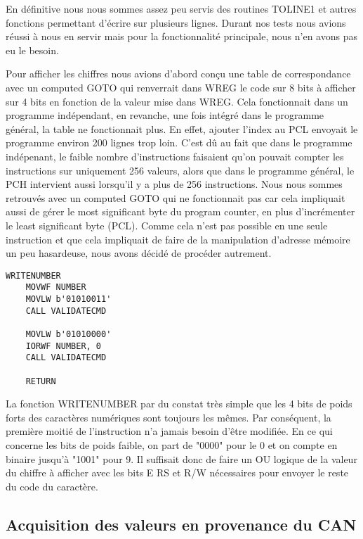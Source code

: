 \documentclass[a4paper,11pt,titlepage]{article}
\begin{document}
En définitive nous nous sommes assez peu servis des routines TOLINE1 et autres fonctions permettant d'écrire sur plusieurs lignes. Durant nos tests nous avions réussi à nous en servir mais pour la fonctionnalité principale, nous n'en avons pas eu le besoin.

Pour afficher les chiffres nous avions d'abord conçu une table de correspondance avec un computed GOTO qui renverrait dans WREG le code sur 8 bits à afficher sur 4 bits en fonction de la valeur mise dans WREG. Cela fonctionnait dans un programme indépendant, en revanche, une fois intégré dans le programme général, la table ne fonctionnait plus. En effet, ajouter l'index au PCL envoyait le programme environ 200 lignes trop loin. C'est dû au fait que dans le programme indépenant, le faible nombre d'instructions faisaient qu'on pouvait compter les instructions sur uniquement 256 valeurs, alors que dans le programme général, le PCH intervient aussi lorsqu'il y a plus de 256 instructions. Nous nous sommes retrouvés avec un computed GOTO qui ne fonctionnait pas car cela impliquait aussi de gérer le most significant byte du program counter, en plus d'incrémenter le least significant byte (PCL). Comme cela n'est pas possible en une seule instruction et que cela impliquait de faire de la manipulation d'adresse mémoire un peu hasardeuse, nous avons décidé de procéder autrement.

\begin{lstlisting}
WRITENUMBER
    MOVWF NUMBER
    MOVLW b'01010011'
    CALL VALIDATECMD
    
    MOVLW b'01010000'
    IORWF NUMBER, 0
    CALL VALIDATECMD
    
    RETURN	    
\end{lstlisting}

La fonction WRITENUMBER par du constat très simple que les 4 bits de poids forts des caractères numériques sont toujours les mêmes. Par conséquent, la première moitié de l'instruction n'a jamais besoin d'être modifiée. En ce qui concerne les bits de poids faible, on part de "0000" pour le 0 et on compte en binaire jusqu'à "1001" pour 9. Il suffisait donc de faire un OU logique de la valeur du chiffre à afficher avec les bits E RS et R/W nécessaires pour envoyer le reste du code du caractère.

\subsection{Acquisition des valeurs en provenance du CAN}
\end{document}

